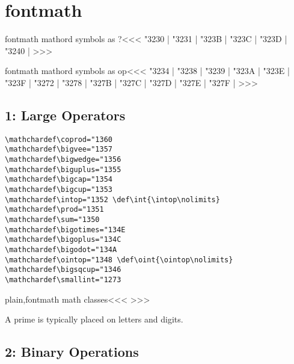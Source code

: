 {{{{{{%
\section{fontmath}




\<fontmath mathord symbols as ?\><<<
\mathchar"3230 |%
\mathchar"3231 |%
\mathchar"323B |%
\mathchar"323C |%
\mathchar"323D |%
\mathchar"3240 |%
>>>

\<fontmath mathord symbols as op\><<<
\mathchar"3234 |%
\mathchar"3238 |%
\mathchar"3239 |%
\mathchar"323A |%
\mathchar"323E |%
\mathchar"323F |%
\mathchar"3272 |%
\mathchar"3278 |%
\mathchar"327B |%
\mathchar"327C |%
\mathchar"327D |%
\mathchar"327E |%
\mathchar"327F |%
>>>



\subsection{1: Large Operators}

\begin{verbatim}
\mathchardef\coprod="1360
\mathchardef\bigvee="1357
\mathchardef\bigwedge="1356
\mathchardef\biguplus="1355
\mathchardef\bigcap="1354
\mathchardef\bigcup="1353
\mathchardef\intop="1352 \def\int{\intop\nolimits}
\mathchardef\prod="1351
\mathchardef\sum="1350
\mathchardef\bigotimes="134E
\mathchardef\bigoplus="134C
\mathchardef\bigodot="134A
\mathchardef\ointop="1348 \def\oint{\ointop\nolimits}
\mathchardef\bigsqcup="1346
\mathchardef\smallint="1273
\end{verbatim}

\<plain,fontmath math classes\><<<
>>>


A prime is typically  placed on letters and digits.


\subsection{2: Binary Operations}

}}}}}}
